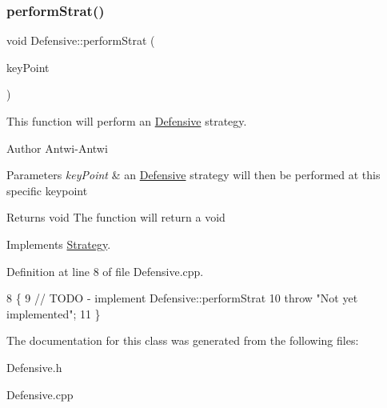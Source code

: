 \subsubsection{\texorpdfstring{perform\+Strat()}{performStrat()}}
{\footnotesize\ttfamily void Defensive\+::perform\+Strat (\begin{DoxyParamCaption}\item[{\hyperlink{classKeyPoint}{Key\+Point} $\ast$}]{key\+Point }\end{DoxyParamCaption})\hspace{0.3cm}{\ttfamily [virtual]}}



This function will perform an \hyperlink{classDefensive}{Defensive} strategy. 

\begin{DoxyAuthor}{Author}
Antwi-\/\+Antwi
\end{DoxyAuthor}

\begin{DoxyParams}{Parameters}
{\em key\+Point} & an \hyperlink{classDefensive}{Defensive} strategy will then be performed at this specific keypoint\\
\hline
\end{DoxyParams}
\begin{DoxyReturn}{Returns}
void The function will return a void 
\end{DoxyReturn}


Implements \hyperlink{classStrategy_ada170bd47bc6f11ac02d7df2b366387b}{Strategy}.



Definition at line 8 of file Defensive.\+cpp.


\begin{DoxyCode}
8                                                \{
9     \textcolor{comment}{// TODO - implement Defensive::performStrat}
10     \textcolor{keywordflow}{throw} \textcolor{stringliteral}{"Not yet implemented"};
11 \}
\end{DoxyCode}


The documentation for this class was generated from the following files\+:\begin{DoxyCompactItemize}
\item 
Defensive.\+h\item 
Defensive.\+cpp\end{DoxyCompactItemize}
